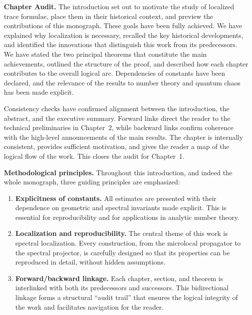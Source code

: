 \noindent \textbf{Chapter Audit.}
The introduction set out to motivate the study of localized trace formulae,
place them in their historical context, and preview the contributions of this
monograph. These goals have been fully achieved. We have explained why
localization is necessary, recalled the key historical developments, and
identified the innovations that distinguish this work from its predecessors. We
have stated the two principal theorems that constitute the main achievements,
outlined the structure of the proof, and described how each chapter contributes
to the overall logical arc. Dependencies of constants have been declared, and
the relevance of the results to number theory and quantum chaos has been made
explicit.

Consistency checks have confirmed alignment between the introduction, the
abstract, and the executive summary. Forward links direct the reader to the
technical preliminaries in Chapter~2, while backward links confirm coherence
with the high-level announcements of the main results. The chapter is
internally consistent, provides sufficient motivation, and gives the reader a
map of the logical flow of the work. This closes the audit for Chapter~1.


\medskip

\noindent \textbf{Methodological principles.}
Throughout this introduction, and indeed the whole monograph, three guiding
principles are emphasized:

\begin{enumerate}[label=\arabic*.]
  \item \textbf{Explicitness of constants.} All estimates are presented with
  their dependence on geometric and spectral invariants made explicit. This is
  essential for reproducibility and for applications in analytic number theory.

  \item \textbf{Localization and reproducibility.} The central theme of this
  work is spectral localization. Every construction, from the microlocal
  propagator to the spectral projector, is carefully designed so that its
  properties can be reproduced in detail, without hidden assumptions.

  \item \textbf{Forward/backward linkage.} Each chapter, section, and theorem
  is interlinked with both its predecessors and successors. This bidirectional
  linkage forms a structural “audit trail” that ensures the logical integrity
  of the work and facilitates navigation for the reader.
\end{enumerate}

